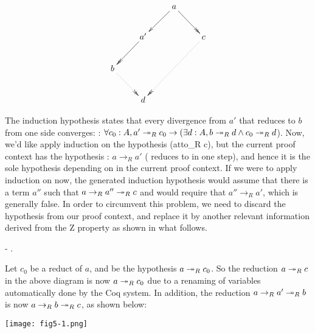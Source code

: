          \[\xymatrix{ & & a \ar@{->}[dl] \ar@{->>}[dr] & \\ & a'
        \ar@{->>}[dl] & & c \ar@{.>>}[ddll] \\ b \ar@{.>>}[dr] & & &
        \\ & d & & }\] 


        

        The induction hypothesis states that every divergence from
        $a'$ that reduces to $b$ from one side converges: 
        : $\forall c_0 : A, a'\twoheadrightarrow_R c_0 \to (\exists d : A, b\twoheadrightarrow_R d
        \land c_0\twoheadrightarrow_R d$). Now, we'd like apply induction on the
        hypothesis  (atto\_R c), but the current proof context has the
        hypothesis : $a\to_R a'$ ( reduces to  in one step),
        and hence it is the sole hypothesis depending on  in the
        current proof context. If we were to apply induction on  now, 
        the generated induction hypothesis  would assume that there is 
        a term $a''$ such that $a \to_R a'' \twoheadrightarrow_R c$ and would require that 
        $a'' \to_R a'$, which is generally false. In order to circumvent 
        this problem, we need to discard the hypothesis  from our proof 
        context, and replace it by another relevant information derived from 
        the Z property as shown in what follows. \begin{coqdoccode}
\coqdocemptyline
\coqdocindent{1.00em}
-   . \end{coqdoccode}
Let $c_0$ be a reduct of $a$, and 
    be the hypothesis $a \twoheadrightarrow_R c_0$. So the reduction $a\twoheadrightarrow_R c$ in
    the above diagram is now $a\twoheadrightarrow_R c_0$ due to a renaming of
    variables automatically done by the Coq system. In addition, the
    reduction $a \to_R a' \twoheadrightarrow_R b$ is now $a\to_R b \twoheadrightarrow_R c$, as
    shown below:


    \texttt{[image: fig5-1.png]}



